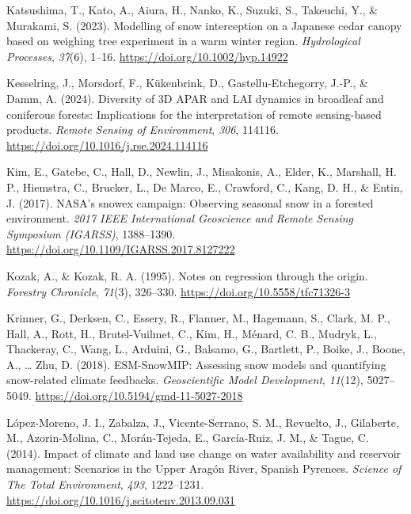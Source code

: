 \documentclass[
]{agujournal2019}
\newlength{\cslhangindent}
\newenvironment{CSLReferences}[2] %
 {\begin{list}{}{%
  \setlength{\itemindent}{0pt}
  \setlength{\leftmargin}{0pt}
  \setlength{\parsep}{0pt}
  \ifodd #1
   \setlength{\leftmargin}{\cslhangindent}
   \setlength{\itemindent}{-1\cslhangindent}
  \fi
  \setlength{\itemsep}{#2\baselineskip}}}
 {\end{list}}
\begin{document}
\begin{CSLReferences}{1}{0}
Katsushima, T., Kato, A., Aiura, H., Nanko, K., Suzuki, S., Takeuchi,
Y., \& Murakami, S. (2023). Modelling of snow interception on a
{Japanese} cedar canopy based on weighing tree experiment in a warm
winter region. \emph{Hydrological Processes}, \emph{37}(6), 1--16.
\url{https://doi.org/10.1002/hyp.14922}

Kesselring, J., Morsdorf, F., Kükenbrink, D., Gastellu-Etchegorry,
J.-P., \& Damm, A. (2024). Diversity of {3D APAR} and {LAI} dynamics in
broadleaf and coniferous forests: {Implications} for the interpretation
of remote sensing-based products. \emph{Remote Sensing of Environment},
\emph{306}, 114116. \url{https://doi.org/10.1016/j.rse.2024.114116}

Kim, E., Gatebe, C., Hall, D., Newlin, J., Misakonis, A., Elder, K.,
Marshall, H. P., Hiemstra, C., Brucker, L., De Marco, E., Crawford, C.,
Kang, D. H., \& Entin, J. (2017). {NASA}'s snowex campaign: {Observing}
seasonal snow in a forested environment. \emph{2017 {IEEE} International
Geoscience and Remote Sensing Symposium ({IGARSS})}, 1388--1390.
\url{https://doi.org/10.1109/IGARSS.2017.8127222}

Kozak, A., \& Kozak, R. A. (1995). Notes on regression through the
origin. \emph{Forestry Chronicle}, \emph{71}(3), 326--330.
\url{https://doi.org/10.5558/tfc71326-3}

Krinner, G., Derksen, C., Essery, R., Flanner, M., Hagemann, S., Clark,
M. P., Hall, A., Rott, H., Brutel-Vuilmet, C., Kim, H., Ménard, C. B.,
Mudryk, L., Thackeray, C., Wang, L., Arduini, G., Balsamo, G., Bartlett,
P., Boike, J., Boone, A., \ldots{} Zhu, D. (2018). {ESM-SnowMIP}:
{Assessing} snow models and quantifying snow-related climate feedbacks.
\emph{Geoscientific Model Development}, \emph{11}(12), 5027--5049.
\url{https://doi.org/10.5194/gmd-11-5027-2018}

López-Moreno, J. I., Zabalza, J., Vicente-Serrano, S. M., Revuelto, J.,
Gilaberte, M., Azorin-Molina, C., Morán-Tejeda, E., García-Ruiz, J. M.,
\& Tague, C. (2014). Impact of climate and land use change on water
availability and reservoir management: {Scenarios} in the {Upper Aragón
River}, {Spanish Pyrenees}. \emph{Science of The Total Environment},
\emph{493}, 1222--1231.
\url{https://doi.org/10.1016/j.scitotenv.2013.09.031}


\end{CSLReferences}
\end{document}
